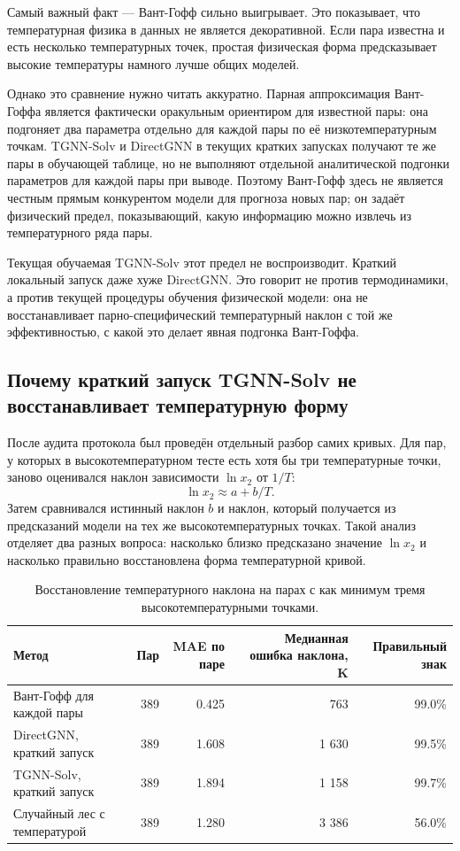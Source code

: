 \documentclass[11pt]{article}
\theoremstyle{definition}
\begin{document}
Самый важный факт --- Вант-Гофф сильно выигрывает. Это показывает, что температурная физика в данных не является декоративной. Если пара известна и есть несколько температурных точек, простая физическая форма предсказывает высокие температуры намного лучше общих моделей.

Однако это сравнение нужно читать аккуратно. Парная аппроксимация Вант-Гоффа является фактически оракульным ориентиром для известной пары: она подгоняет два параметра отдельно для каждой пары по её низкотемпературным точкам. TGNN-Solv и DirectGNN в текущих кратких запусках получают те же пары в обучающей таблице, но не выполняют отдельной аналитической подгонки параметров для каждой пары при выводе. Поэтому Вант-Гофф здесь не является честным прямым конкурентом модели для прогноза новых пар; он задаёт физический предел, показывающий, какую информацию можно извлечь из температурного ряда пары.

Текущая обучаемая TGNN-Solv этот предел не воспроизводит. Краткий локальный запуск даже хуже DirectGNN. Это говорит не против термодинамики, а против текущей процедуры обучения физической модели: она не восстанавливает парно-специфический температурный наклон с той же эффективностью, с какой это делает явная подгонка Вант-Гоффа.

\subsection{Почему краткий запуск TGNN-Solv не восстанавливает температурную форму}

После аудита протокола был проведён отдельный разбор самих кривых. Для пар, у которых в высокотемпературном тесте есть хотя бы три температурные точки, заново оценивался наклон зависимости $\ln x_2$ от $1/T$:
\[
    \ln x_2 \approx a + b/T.
\]
Затем сравнивался истинный наклон $b$ и наклон, который получается из предсказаний модели на тех же высокотемпературных точках. Такой анализ отделяет два разных вопроса: насколько близко предсказано значение $\ln x_2$ и насколько правильно восстановлена форма температурной кривой.

\begin{table}[H]
\centering
\caption{Восстановление температурного наклона на парах с как минимум тремя высокотемпературными точками.}
\label{tab:temp-slope-diagnostics}
\small
\begin{tabularx}{\textwidth}{Yrrrr}
\toprule
Метод & Пар & MAE по паре & Медианная ошибка наклона, K & Правильный знак \\
\midrule
Вант-Гофф для каждой пары & 389 & 0.425 & 763 & 99.0\% \\
DirectGNN, краткий запуск & 389 & 1.608 & 1 630 & 99.5\% \\
TGNN-Solv, краткий запуск & 389 & 1.894 & 1 158 & 99.7\% \\
Случайный лес с температурой & 389 & 1.280 & 3 386 & 56.0\% \\
\bottomrule
\end{tabularx}
\end{table}
\end{document}

